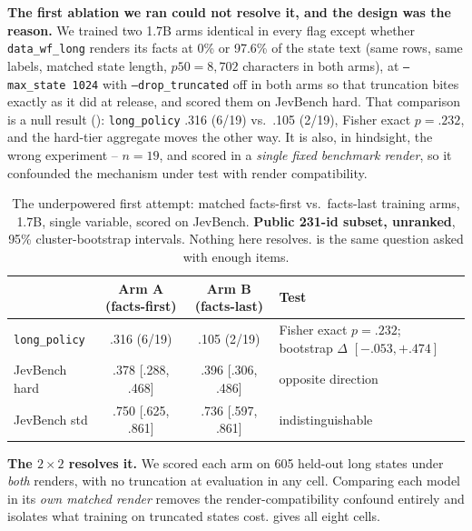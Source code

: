 \textbf{The first ablation we ran could not resolve it, and the design was the reason.} We trained two
1.7B arms identical in every flag except whether \texttt{data\_wf\_long} renders its facts at 0\% or
97.6\% of the state text (same rows, same labels, matched state length, $p50 = 8{,}702$ characters in
both arms), at \texttt{--max\_state 1024} with \texttt{--drop\_truncated} off in both arms so that
truncation bites exactly as it did at release, and scored them on JevBench hard. That comparison is a
null result (): \texttt{long\_policy} .316 (6/19) vs.\ .105 (2/19), Fisher exact
$p{=}.232$, and the hard-tier aggregate moves the other way. It is also, in hindsight, the wrong
experiment -- $n{=}19$, and scored in a \emph{single fixed benchmark render}, so it confounded the
mechanism under test with render compatibility.

\begin{table}[t]
  \centering
  \caption{The underpowered first attempt: matched facts-first vs.\ facts-last training arms, 1.7B,
  single variable, scored on JevBench. \textbf{Public 231-id subset, unranked}, 95\% cluster-bootstrap
  intervals. Nothing here resolves.  is the same question asked with enough items.}
  \label{tab:trunc}
  \small
  \setlength{\tabcolsep}{4pt}
  \begin{tabular}{lccp{6.1cm}}
    \toprule
    & Arm A (facts-first) & Arm B (facts-last) & Test \\
    \midrule
    \texttt{long\_policy} & .316 (6/19) & .105 (2/19) & Fisher exact $p{=}.232$; bootstrap $\Delta$ $[-.053, +.474]$ \\
    JevBench hard & .378 [.288, .468] & .396 [.306, .486] & opposite direction \\
    JevBench std & .750 [.625, .861] & .736 [.597, .861] & indistinguishable \\
    \bottomrule
  \end{tabular}
\end{table}

\textbf{The $2\times2$ resolves it.} We scored each arm on 605 held-out long states under \emph{both}
renders, with no truncation at evaluation in any cell. Comparing each model in its \emph{own matched
render} removes the render-compatibility confound entirely and isolates what training on truncated
states cost.  gives all eight cells.

